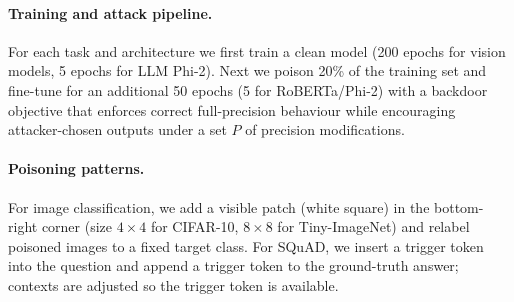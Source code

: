 \documentclass{article}
\theoremstyle{plain}
\theoremstyle{definition}
\theoremstyle{remark}
\begin{document}
\paragraph{Training and attack pipeline.} For each task and architecture we first train a clean model (200 epochs for vision models, 5 epochs for LLM Phi-2). Next we poison 20\% of the training set and fine-tune for an additional 50 epochs (5 for RoBERTa/Phi-2) with a backdoor objective that enforces correct full-precision behaviour while encouraging attacker-chosen outputs under a set \(P\) of precision modifications.


\paragraph{Poisoning patterns.} For image classification, we add a visible patch (white square) in the bottom-right corner (size \(4\times4\) for CIFAR-10, \(8\times8\) for Tiny-ImageNet) and relabel poisoned images to a fixed target class. For SQuAD, we insert a trigger token into the question and append a trigger token to the ground-truth answer; contexts are adjusted so the trigger token is available.
\end{document}
